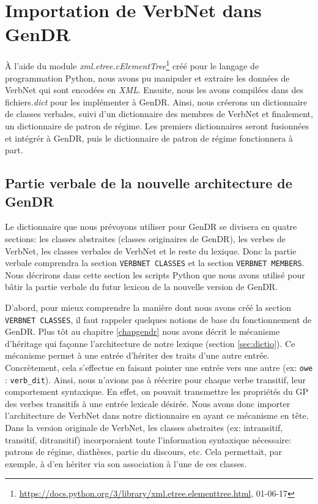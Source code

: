 \chapter{Importation de VerbNet dans GenDR}\label{ch:python}

À l'aide du module \emph{xml.etree.cElementTree}\footnote{\url{https://docs.python.org/3/library/xml.etree.elementtree.html}, 01-06-17} créé pour le langage de programmation Python, nous avons pu manipuler et extraire les données de VerbNet qui sont encodées en \emph{XML}. Ensuite, nous les avons compilées dans des fichiers\emph{.dict} pour les implémenter à GenDR. Ainsi, nous créerons un dictionnaire de classes verbales, suivi d'un dictionnaire des membres de VerbNet et finalement, un dictionnaire de patron de régime. Les premiers dictionnaires seront fusionnées et intégrér à GenDR, puis le dictionnaire de patron de régime fonctionnera à part.
 
\section{Partie verbale de la nouvelle architecture de GenDR}

Le dictionnaire que nous prévoyons utiliser pour GenDR se divisera en quatre sections: les classes abstraites (classes originaires de GenDR), les verbes de VerbNet, les classes verbales de VerbNet et le reste du lexique. Donc la partie verbale comprendra la section \texttt{VERBNET CLASSES} et la section \texttt{VERBNET MEMBERS}. Nous décrirons dans cette section les scripts Python que nous avons utilisé pour bâtir la partie verbale du futur lexicon de la nouvelle version de GenDR.

D'abord, pour mieux comprendre la manière dont nous avons créé la section \texttt{VERBNET CLASSES}, il faut rappeler quelques notions de base du fonctionnement de GenDR. Plus tôt au chapitre \ref{chapgendr} nous avons décrit le mécanisme d'héritage qui façonne l'architecture de notre lexique (section \ref{sec:dictio}). Ce mécanisme permet à une entrée d'hériter des traits d'une autre entrée. Concrètement, cela s'effectue en faisant pointer une entrée vers une autre (ex: \texttt{owe} : \texttt{verb\_dit}). Ainsi, nous n'avions pas à réécrire pour chaque verbe transitif, leur comportement syntaxique. En effet, on pouvait transmettre les propriétés du \ac{GP} des verbes transitifs à une entrée lexicale désirée. Nous avons donc importer l'architecture de VerbNet dans notre dictionnaire en ayant ce mécanisme en tête. Dans la version originale de VerbNet, les classes abstraites (ex: intransitif, transitif, ditransitif) incorporaient toute l'information syntaxique nécessaire: patrons de régime, diathèses, partie du discours, etc. Cela permettait, par exemple, à  d'en hériter via son association à l'une de ces classes.  

